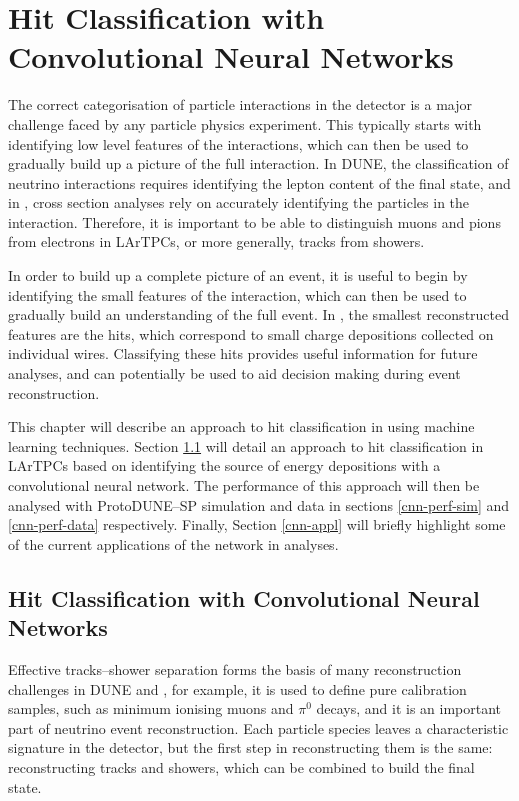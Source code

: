 \chapter{\label{ch:chargeid}Hit Classification with Convolutional Neural Networks} 

\minitoc

\noindent
The correct categorisation of particle interactions in the detector is a major
challenge faced by any particle physics experiment. This typically starts with
identifying low level features of the interactions, which can then be used to
gradually build up a picture of the full interaction. In DUNE, the
classification of neutrino interactions requires identifying the lepton content
of the final state, and in \protodune{}, cross section analyses rely on
accurately identifying the particles in the interaction. Therefore, it is
important to be able to distinguish muons and pions from electrons in LArTPCs, 
or more generally, tracks from showers.

In order to build up a complete picture of an event, it is useful to begin by
identifying the small features of the interaction, which can then be used to
gradually build an understanding of the full event. In \protodune{}, the
smallest reconstructed features are the hits, which correspond to small charge 
depositions collected on individual wires. Classifying these hits provides
useful information for future analyses, and can potentially be used to aid
decision making during event reconstruction.

This chapter will describe an approach to hit classification in \protodune{} 
using machine learning techniques. Section \ref{hit-id} will detail an 
approach to hit classification in LArTPCs based on identifying the source of 
energy depositions with a convolutional neural network. The performance of 
this approach will then be analysed with ProtoDUNE--SP simulation and data in 
sections \ref{cnn-perf-sim} and \ref{cnn-perf-data} respectively. Finally,
Section \ref{cnn-appl} will briefly highlight some of the current applications 
of the network in \protodune{} analyses.

\section{Hit Classification with Convolutional Neural Networks} \label{hit-id}

Effective tracks--shower separation forms the basis of many reconstruction
challenges in DUNE and \protodune{}, for example, it is used to define pure 
calibration samples, such as minimum ionising muons and $\pi^0$ decays, and it 
is an important part of neutrino event reconstruction. Each particle species 
leaves a characteristic signature in the detector, but the first step in 
reconstructing them is the same: reconstructing tracks and showers, which can 
be combined to build the final state. 

